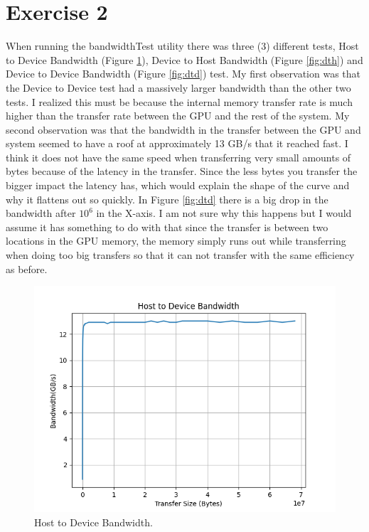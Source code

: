 \documentclass[a4paper, 12pt]{article}
\begin{document}
\section{Exercise 2}
When running the bandwidthTest utility there was three (3) different tests, Host to Device Bandwidth (Figure \ref{fig:htd}), Device to Host Bandwidth (Figure \ref{fig:dth}) and Device to Device Bandwidth (Figure \ref{fig:dtd}) test.
My first observation was that the Device to Device test had a massively larger bandwidth than the other two tests. I realized this must be because the internal memory transfer rate is much higher than the transfer rate between the GPU and the rest of the system. My second observation was that the bandwidth in the transfer between the GPU and system seemed to have a roof at approximately 13 GB/s that it reached fast. I think it does not have the same speed when transferring very small amounts of bytes because of the latency in the transfer. Since the less bytes you transfer the bigger impact the latency has, which would explain the shape of the curve and why it flattens out so quickly. In Figure \ref{fig:dtd} there is a big drop in the bandwidth after $10^6$ in the X-axis. I am not sure why this happens but I would assume it has something to do with that since the transfer is between two locations in the GPU memory, the memory simply runs out while transferring when doing too big transfers so that it can not transfer with the same efficiency as before.
\begin{figure}
	\centering
	\includegraphics[width=0.8\linewidth]{host-to-device.png}
	\caption{Host to Device Bandwidth.}
	\label{fig:htd}
\end{figure}
\end{document}
